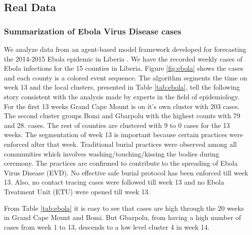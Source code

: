 \subsection{Real Data}
\label{sec:realdata}
\subsubsection{Summarization of Ebola Virus Disease cases}
We analyze data from an agent-based model framework developed for forecasting the 2014-2015 Ebola epidemic in Liberia \cite{VENKATRAMANAN:2018}. We have the recorded weekly cases of Ebola infections for the 15 counties in Liberia. Figure \ref{fig:ebola} shows the cases and each county is a colored event sequence. The algorithm segments  the time on week 13 and the local clusters, presented in Table \ref{tab:ebola}, tell the following story consistent with the analysis made by experts in the field of epidemiology. For the first 13 weeks Grand Cape Mount is on it's own cluster with 203 cases. The second cluster groups Bomi and Gbarpolu with the highest counts with 79 and 28. cases. The rest of counties are clustered with 9 to 0 cases for the 13 weeks. The segmentation of week 13 is important because certain practices were enforced after that week. Traditional burial practices were observed among all communities which involves washing/touching/kissing the bodies during ceremony. The practices are confirmed to contribute to the spreading of Ebola Virus Disease (EVD). No effective safe burial protocol has been enforced till week 13. Also, no contact tracing cases were followed till week 13 and no Ebola Treatment Unit (ETU) were opened till week 13. 
 
From Table \ref{tab:ebola} it is easy to see that cases are high through the 20 weeks in Grand Cape Mount and Bomi. But Gbarpolu, from having a high number of cases from week 1 to 13, descends to a low level cluster 4 in week 14.
 
